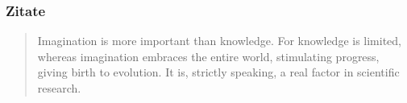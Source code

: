 \begin{frame}
    \frametitle{Zitate}
    \begin{quote}
    Imagination is more important than knowledge. For knowledge is limited, whereas imagination embraces the entire world, stimulating progress, giving birth to evolution. It is, strictly speaking, a real factor in scientific research.
    \end{quote}
\end{frame}